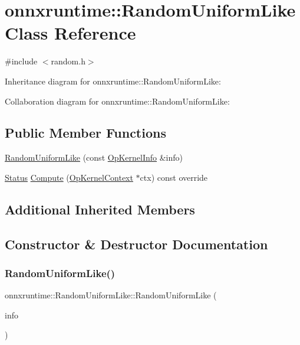 \hypertarget{classonnxruntime_1_1RandomUniformLike}{}\section{onnxruntime\+:\+:Random\+Uniform\+Like Class Reference}
\label{classonnxruntime_1_1RandomUniformLike}


{\ttfamily \#include $<$random.\+h$>$}



Inheritance diagram for onnxruntime\+:\+:Random\+Uniform\+Like\+:


Collaboration diagram for onnxruntime\+:\+:Random\+Uniform\+Like\+:
\subsection*{Public Member Functions}
\begin{DoxyCompactItemize}
\item 
\mbox{\hyperlink{classonnxruntime_1_1RandomUniformLike_a21349c5c28a588d69a8b7e39f8b0dd5a}{Random\+Uniform\+Like}} (const \mbox{\hyperlink{classonnxruntime_1_1OpKernelInfo}{Op\+Kernel\+Info}} \&info)
\item 
\mbox{\hyperlink{classonnxruntime_1_1common_1_1Status}{Status}} \mbox{\hyperlink{classonnxruntime_1_1RandomUniformLike_aa5c4616051d517ca64d6c605f88ca89e}{Compute}} (\mbox{\hyperlink{classonnxruntime_1_1OpKernelContext}{Op\+Kernel\+Context}} $\ast$ctx) const override
\end{DoxyCompactItemize}
\subsection*{Additional Inherited Members}


\subsection{Constructor \& Destructor Documentation}
\mbox{\label{classonnxruntime_1_1RandomUniformLike_a21349c5c28a588d69a8b7e39f8b0dd5a}} 
\subsubsection{\texorpdfstring{Random\+Uniform\+Like()}{RandomUniformLike()}}
{\footnotesize\ttfamily onnxruntime\+::\+Random\+Uniform\+Like\+::\+Random\+Uniform\+Like (\begin{DoxyParamCaption}\item[{const \mbox{\hyperlink{classonnxruntime_1_1OpKernelInfo}{Op\+Kernel\+Info}} \&}]{info }\end{DoxyParamCaption})\hspace{0.3cm}{\ttfamily [inline]}}



